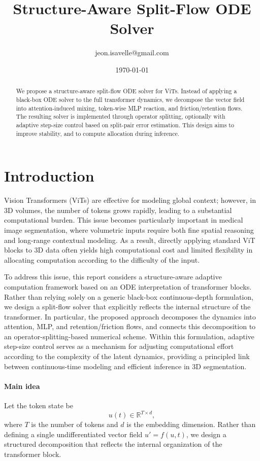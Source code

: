 \documentclass{article}
\title{\textbf{Structure-Aware Split-Flow ODE Solver}}
\author{jeon.isavelle@gmail.com}
\date{\today}
\newcommand{\R}{\mathbb{R}}
\begin{document}
\maketitle

\begin{abstract}
We propose a structure-aware split-flow ODE solver for ViTs. Instead of applying a black-box ODE solver to the full transformer dynamics, we decompose the vector field into attention-induced mixing, token-wise MLP reaction, and friction/retention flows. The resulting solver is implemented through operator splitting, optionally with adaptive step-size control based on split-pair error estimation. This design aims to improve stability, and to compute allocation during inference.
\end{abstract}

\section{Introduction}

Vision Transformers (ViTs) are effective for modeling global context; however, in 3D volumes, the number of tokens grows rapidly, leading to a substantial computational burden. This issue becomes particularly important in medical image segmentation, where volumetric inputs require both fine spatial reasoning and long-range contextual modeling. As a result, directly applying standard ViT blocks to 3D data often yields high computational cost and limited flexibility in allocating computation according to the difficulty of the input.

To address this issue, this report considers a structure-aware adaptive computation framework based on an ODE interpretation of transformer blocks. Rather than relying solely on a generic black-box continuous-depth formulation, we design a split-flow solver that explicitly reflects the internal structure of the transformer. In particular, the proposed approach decomposes the dynamics into attention, MLP, and retention/friction flows, and connects this decomposition to an operator-splitting-based numerical scheme. Within this formulation, adaptive step-size control serves as a mechanism for adjusting computational effort according to the complexity of the latent dynamics, providing a principled link between continuous-time modeling and efficient inference in 3D segmentation.

\paragraph{Main idea}
Let the token state be
\begin{equation}
    u(t) \in \R^{T \times d},
\end{equation}
where $T$ is the number of tokens and $d$ is the embedding dimension. Rather than defining a single undifferentiated vector field $u' = f(u,t)$, we design a structured decomposition that reflects the internal organization of the transformer block.
\end{document}
